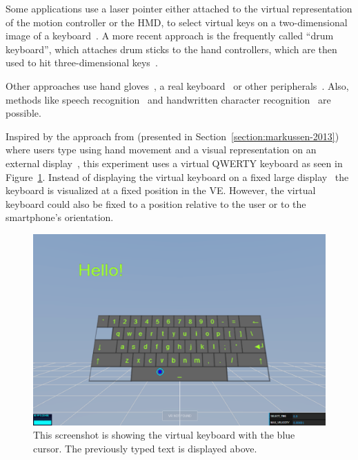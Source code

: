 Some applications use a laser pointer either attached to the virtual representation of the motion controller or the \gls{HMD}, to select virtual keys on a two-dimensional image of a keyboard~\cite{Speicher.2018}. A more recent approach is the frequently called \enquote{drum keyboard}, which attaches drum sticks to the hand controllers, which are then used to hit three-dimensional keys~\cite{Weisel.2017}.

Other approaches use hand gloves~\cite{Evans.1999,Rhoton.2002}, a real keyboard~\cite{McGill.2015,Walker.2017} or other peripherals~\cite[111\psq]{Gonzalez.2009}. Also, methods like speech recognition~\cite[2154\psqq]{Rhoton.2002} and handwritten character recognition~\cite[113]{Gonzalez.2009} are possible.

Inspired by the approach from \citeauthor{Markussen.2013} (presented in Section~\ref{section:markussen-2013}) where users type using hand movement and a visual representation on an external display~\cite[408]{Markussen.2013}, this experiment uses a virtual QWERTY keyboard as seen in Figure~\ref{fig:screenshot-exp-vk}.
Instead of displaying the virtual keyboard on a fixed large display~\cite[408]{Markussen.2013} the keyboard is visualized at a fixed position in the \gls{VE}. However, the virtual keyboard could also be fixed to a position relative to the user or to the smartphone's orientation.

\begin{figure}[H]
	\centering
	\includegraphics[width=12cm]{figures/experiments/screenshot_exp_vk.png}
	\caption[Screenshot of the virtual keyboard]{This screenshot is showing the virtual keyboard with the blue cursor. The previously typed text is displayed above.}\label{fig:screenshot-exp-vk}
\end{figure}

